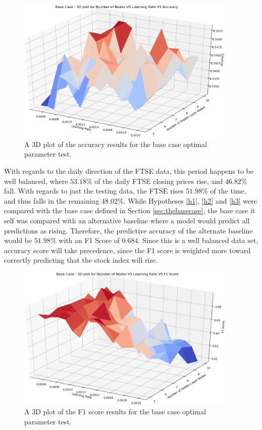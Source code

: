 \documentclass{UoYCSproject}
\begin{document}
\begin{figure}[h]
\includegraphics[width=10.5cm]{base_accuracy.png}
\centering
\caption{A 3D plot of the accuracy results for the base case optimal parameter test.} 
\label{fig:base_plot_accuracy}
\end{figure}

With regards to the daily direction of the FTSE data, this period happens to be well balanced, where $53.18$\% of the daily FTSE closing prices rise, and $46.82$\% fall. With regards to just the testing data, the FTSE rises $51.98$\% of the time, and thus falls in the remaining $48.02$\%. While Hypotheses \ref{h1}, \ref{h2} and \ref{h3} were compared with the base case defined in Section \ref{sec:thebasecase}, the base case it self was compared with an alternative baseline where a model would predict all predictions as rising. Therefore, the predictive accuracy of the alternate baseline would be $51.98$\% with an F1 Score of $0.684$. Since this is a well balanced data set, accuracy score will take precedence, since the F1 score is weighted more toward correctly predicting that the stock index will rise.

\begin{figure}[h]
\includegraphics[width=10.5cm]{base_f1.png}
\centering
\caption{A 3D plot of the F1 score results for the base case optimal parameter test.} 
\label{fig:base_plot_f1}
\end{figure}
\end{document}
